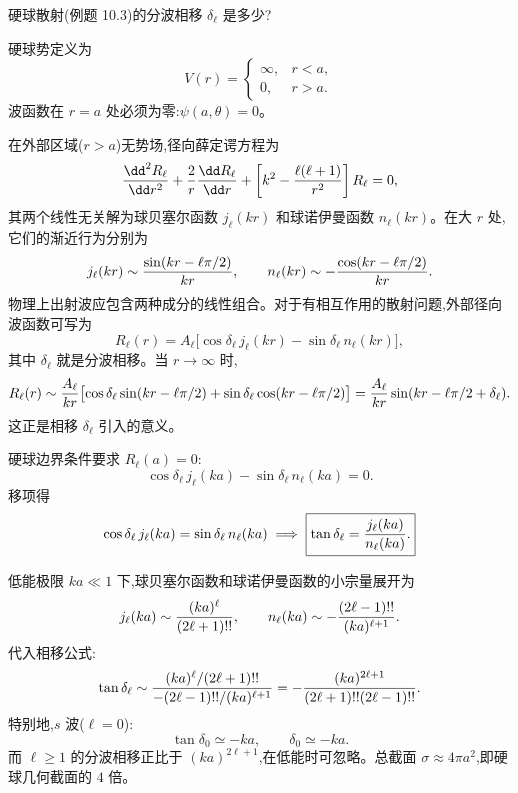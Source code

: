 \begin{question}
硬球散射(例题 10.3)的分波相移 $\delta_\ell$ 是多少?
\end{question}
\begin{solution}
硬球势定义为
\[
V(r)=\begin{cases}
\infty,& r<a,\\
0,& r>a.
\end{cases}
\]
波函数在 $r=a$ 处必须为零:$\psi(a,\theta)=0$。

在外部区域($r>a$)无势场,径向薛定谔方程为
\[
{\dd^2R_\ell\over\dd r^2}+{2\over r}{\dd R_\ell\over\dd r}+\left[k^2-{\ell(\ell+1)\over r^2}\right]R_\ell=0,
\]
其两个线性无关解为球贝塞尔函数 $j_\ell(kr)$ 和球诺伊曼函数 $n_\ell(kr)$。在大 $r$ 处,它们的渐近行为分别为
\[
j_\ell(kr)\sim{\sin(kr-\ell\pi/2)\over kr},\qquad
n_\ell(kr)\sim-{\cos(kr-\ell\pi/2)\over kr}.
\]
物理上出射波应包含两种成分的线性组合。对于有相互作用的散射问题,外部径向波函数可写为
\[
R_\ell(r)=A_\ell\bigl[\cos\delta_\ell\,j_\ell(kr)-\sin\delta_\ell\,n_\ell(kr)\bigr],
\]
其中 $\delta_\ell$ 就是分波相移。当 $r\to\infty$ 时,
\[
R_\ell(r)\sim{A_\ell\over kr}\bigl[\cos\delta_\ell\sin(kr-\ell\pi/2)+\sin\delta_\ell\cos(kr-\ell\pi/2)\bigr]
={A_\ell\over kr}\sin(kr-\ell\pi/2+\delta_\ell).
\]
这正是相移 $\delta_\ell$ 引入的意义。

硬球边界条件要求 $R_\ell(a)=0$:
\[
\cos\delta_\ell\,j_\ell(ka)-\sin\delta_\ell\,n_\ell(ka)=0.
\]
移项得
\[
\cos\delta_\ell\,j_\ell(ka)=\sin\delta_\ell\,n_\ell(ka)
\;\Longrightarrow\;
\boxed{\tan\delta_\ell={j_\ell(ka)\over n_\ell(ka)}.}
\]

低能极限 $ka\ll1$ 下,球贝塞尔函数和球诺伊曼函数的小宗量展开为
\[
j_\ell(ka)\sim{(ka)^\ell\over(2\ell+1)!!},\qquad
n_\ell(ka)\sim-{(2\ell-1)!!\over(ka)^{\ell+1}}.
\]
代入相移公式:
\[
\tan\delta_\ell\sim{(ka)^\ell/(2\ell+1)!!\over-(2\ell-1)!!/(ka)^{\ell+1}}
=-{(ka)^{2\ell+1}\over(2\ell+1)!!(2\ell-1)!!}.
\]
特别地,$s$ 波($\ell=0$):
\[
\tan\delta_0\simeq -ka,\qquad\boxed{\delta_0\simeq -ka.}
\]
而 $\ell\ge1$ 的分波相移正比于 $(ka)^{2\ell+1}$,在低能时可忽略。总截面 $\sigma\approx 4\pi a^2$,即硬球几何截面的 $4$ 倍。
\end{solution}

